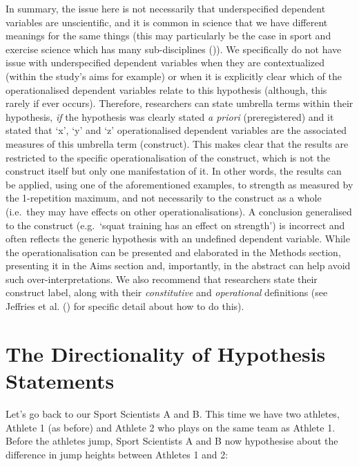 \documentclass[
]{article}
\begin{document}
In summary, the issue here is not necessarily that underspecified
dependent variables are unscientific, and it is common in science that
we have different meanings for the same things (this may particularly be
the case in sport and exercise science which has many sub-disciplines
()). We specifically do not
have issue with underspecified dependent variables when they are
contextualized (within the study's aims for example) or when it is
explicitly clear which of the operationalised dependent variables relate
to this hypothesis (although, this rarely if ever occurs). Therefore,
researchers can state umbrella terms within their hypothesis, \emph{if}
the hypothesis was clearly stated \emph{a priori} (preregistered) and it
stated that `x', `y' and `z' operationalised dependent variables are the
associated measures of this umbrella term (construct). This makes clear
that the results are restricted to the specific operationalisation of
the construct, which is not the construct itself but only one
manifestation of it. In other words, the results can be applied, using
one of the aforementioned examples, to strength as measured by the
1-repetition maximum, and not necessarily to the construct as a whole
(i.e.~they may have effects on other operationalisations). A conclusion
generalised to the construct (e.g.~`squat training has an effect on
strength') is incorrect and often reflects the generic hypothesis with
an undefined dependent variable. While the operationalisation can be
presented and elaborated in the Methods section, presenting it in the
Aims section and, importantly, in the abstract can help avoid such
over-interpretations. We also recommend that researchers state their
construct label, along with their \emph{constitutive} and
\emph{operational} definitions (see Jeffries et al.
() for specific detail
about how to do this).

\section{The Directionality of Hypothesis
Statements}\label{the-directionality-of-hypothesis-statements}

Let's go back to our Sport Scientists A and B. This time we have two
athletes, Athlete 1 (as before) and Athlete 2 who plays on the same team
as Athlete 1. Before the athletes jump, Sport Scientists A and B now
hypothesise about the difference in jump heights between Athletes 1 and
2:
\end{document}
